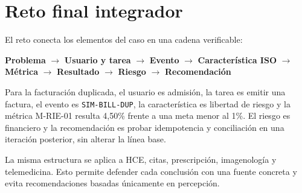 \chapter{Reto final integrador}

El reto conecta los elementos del caso en una cadena verificable:

\begin{center}
\textbf{Problema} $\rightarrow$ \textbf{Usuario y tarea} $\rightarrow$ \textbf{Evento} $\rightarrow$ \textbf{Característica ISO} $\rightarrow$ \textbf{Métrica} $\rightarrow$ \textbf{Resultado} $\rightarrow$ \textbf{Riesgo} $\rightarrow$ \textbf{Recomendación}
\end{center}

Para la facturación duplicada, el usuario es admisión, la tarea es emitir una factura, el evento es \texttt{SIM-BILL-DUP}, la característica es libertad de riesgo y la métrica M-RIE-01 resulta 4,50\% frente a una meta menor al 1\%. El riesgo es financiero y la recomendación es probar idempotencia y conciliación en una iteración posterior, sin alterar la línea base.

La misma estructura se aplica a HCE, citas, prescripción, imagenología y telemedicina. Esto permite defender cada conclusión con una fuente concreta y evita recomendaciones basadas únicamente en percepción.

